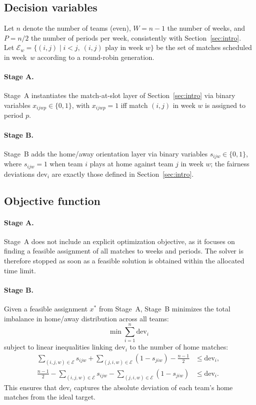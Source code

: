 \documentclass{article}
\begin{document}
\subsection{Decision variables}

Let $n$ denote the number of teams (even), $W = n-1$ the number of weeks,
and $P = n/2$ the number of periods per week, consistently with
Section~\ref{sec:intro}.  
Let $\mathcal{E}_w = \{(i,j)\mid i<j,\ (i,j)\text{ play in week }w\}$ be the
set of matches scheduled in week~$w$ according to a round-robin generation.

\paragraph{Stage A.}
Stage~A instantiates the match-at-slot layer of Section~\ref{sec:intro} via
binary variables $x_{ijwp}\in\{0,1\}$, with $x_{ijwp}=1$ iff match $(i,j)$ in
week $w$ is assigned to period $p$.

\paragraph{Stage B.}
Stage~B adds the home/away orientation layer via binary variables
$s_{ijw}\in\{0,1\}$, where $s_{ijw}=1$ when team $i$ plays at home against
team $j$ in week $w$; the fairness deviations $\mathrm{dev}_i$ are exactly
those defined in Section~\ref{sec:intro}.

\subsection{Objective function}

\paragraph{Stage A.}  
Stage~A does not include an explicit optimization objective, as it focuses on finding a
feasible assignment of all matches to weeks and periods. The solver is therefore stopped
as soon as a feasible solution is obtained within the allocated time limit.

\paragraph{Stage B.}  
Given a feasible assignment $x^*$ from Stage~A, Stage~B minimizes the total imbalance in
home/away distribution across all teams:
\[
\min \sum_{i=1}^{n} \mathrm{dev}_i
\]
subject to linear inequalities linking $\mathrm{dev}_i$ to the number of home matches:
\[
\begin{aligned}
    \sum_{(i,j,w)\in\mathcal{E}} s_{ijw} +
    \sum_{(j,i,w)\in\mathcal{E}} (1 - s_{jiw}) - \frac{n-1}{2} &\le \mathrm{dev}_i,\\
    \frac{n-1}{2} - \sum_{(i,j,w)\in\mathcal{E}} s_{ijw} -
    \sum_{(j,i,w)\in\mathcal{E}} (1 - s_{jiw}) &\le \mathrm{dev}_i.
\end{aligned}
\]
This ensures that $\mathrm{dev}_i$ captures the absolute deviation of each team’s
home matches from the ideal target.
\end{document}
